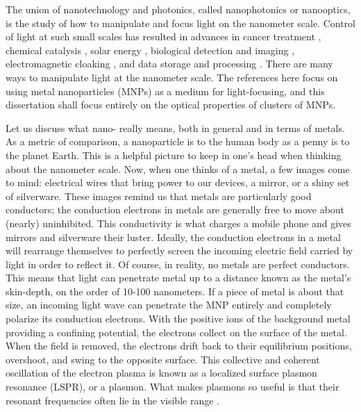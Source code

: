 \documentclass [11pt, proquest] {uwthesis}[2016/11/22]
\begin{document}
The union of nanotechnology and photonics, called nanophotonics or nanooptics, is the study of how to manipulate and focus light on the nanometer scale. Control of light at such small scales has resulted in advances in cancer treatment \cite{ElSayedCancer,LiuCancer}, chemical catalysis \cite{Halas2013,Camden2017}, solar energy \cite{Atwater2014,WuSolar}, biological detection and imaging \cite{vanDuyneSensing,Bezryadina2017}, electromagnetic cloaking \cite{AluCloaking,YeCloaking}, and data storage and processing \cite{MoloneyData,NaughtonData}. There are many ways to manipulate light at the nanometer scale. The references here focus on using metal nanoparticles (MNPs) as a medium for light-focusing, and this dissertation shall focus entirely on the optical properties of clusters of MNPs.

Let us discuss what nano- really means, both in general and in terms of metals. As a metric of comparison, a nanoparticle is to the human body as a penny is to the planet Earth. This is a helpful picture to keep in one's head when thinking about the nanometer scale. Now, when one thinks of a metal, a few images come to mind: electrical wires that bring power to our devices, a mirror, or a shiny set of silverware. These images remind us that metals are particularly good conductors; the conduction electrons in metals are generally free to move about (nearly) uninhibited. This conductivity is what charges a mobile phone and gives mirrors and silverware their luster. Ideally, the conduction electrons in a metal will rearrange themselves to perfectly screen the incoming electric field carried by light in order to reflect it. Of course, in reality, no metals are perfect conductors. This means that light can penetrate metal up to a distance known as the metal's skin-depth, on the order of 10-100 nanometers. If a piece of metal is about that size, an incoming light wave can penetrate the MNP entirely and completely polarize its conduction electrons. With the positive ions of the background metal providing a confining potential, the electrons collect on the surface of the metal. When the field is removed, the electrons drift back to their equilibrium positions, overshoot, and swing to the opposite surface. This collective and coherent oscillation of the electron plasma is known as a localized surface plasmon resonance (LSPR), or a plasmon. What makes plasmons so useful is that their resonant frequencies often lie in the visible range \cite{KREIBIG1985}.
\end{document}

